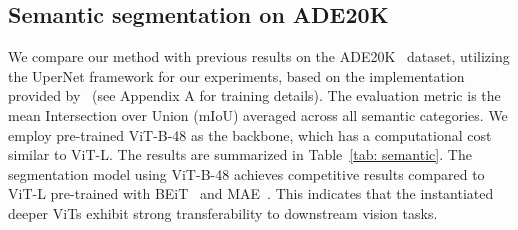 \documentclass{article}
\begin{document}
\vspace{5pt}
\subsection{Semantic segmentation on ADE20K}
We compare our method with previous results on the ADE20K~\cite{zhou2017scene} dataset, utilizing the UperNet framework for our experiments, based on the implementation provided by~\cite{bao2021beit} (see Appendix A for training details). The evaluation metric is the mean Intersection over Union (mIoU) averaged across all semantic categories. We employ pre-trained ViT-B-48 as the backbone, which has a computational cost similar to ViT-L. The results are summarized in Table~\ref{tab: semantic}. The segmentation model using ViT-B-48 achieves competitive results compared to ViT-L pre-trained with BEiT~\cite{bao2021beit} and MAE~\cite{he2022masked}. This indicates that the instantiated deeper ViTs exhibit strong transferability to downstream vision tasks.

\vspace{5pt}
\end{document}
